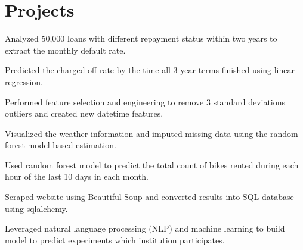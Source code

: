 \documentclass[letterpaper]{deedy-resume-openfont}
\begin{document}

\section{Projects}


\location{}
\begin{tightemize}
\item Analyzed 50,000 loans with different repayment status within two years to extract the monthly default rate.
\item Predicted the charged-off rate by the time all 3-year terms finished using linear regression.
\end{tightemize}
\sectionsep

\location{}
\begin{tightemize}
\item Performed feature selection and engineering to remove 3 standard deviations outliers and created new datetime features.
\item Visualized the weather information and imputed missing data using the random forest model based estimation.
\item Used random forest model to predict the total count of bikes rented during each hour of the last 10 days in each month.
\end{tightemize}
\sectionsep

\location{}
\begin{tightemize}
\item Scraped website using Beautiful Soup and converted results into SQL database using sqlalchemy.
\item Leveraged natural language processing (NLP) and machine learning to build model to predict experiments which institution participates.
\end{tightemize}
\sectionsep
\end{document}
